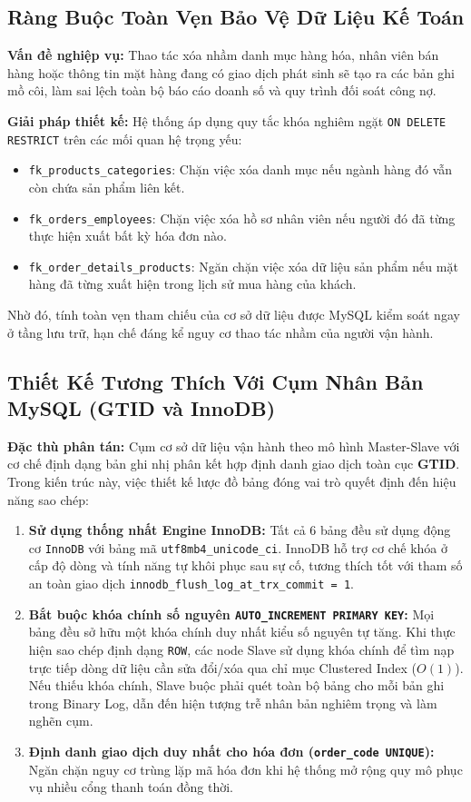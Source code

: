 \documentclass[12pt,a4paper]{report}
\begin{document}
\subsection{Ràng Buộc Toàn Vẹn Bảo Vệ Dữ Liệu Kế Toán}
\noindent\textbf{Vấn đề nghiệp vụ:} Thao tác xóa nhầm danh mục hàng hóa, nhân viên bán hàng hoặc thông tin mặt hàng đang có giao dịch phát sinh sẽ tạo ra các bản ghi mồ côi, làm sai lệch toàn bộ báo cáo doanh số và quy trình đối soát công nợ.

\vspace{0.2cm}
\noindent\textbf{Giải pháp thiết kế:} Hệ thống áp dụng quy tắc khóa nghiêm ngặt \texttt{ON DELETE RESTRICT} trên các mối quan hệ trọng yếu:
\begin{itemize}
    \item \texttt{fk\_products\_categories}: Chặn việc xóa danh mục nếu ngành hàng đó vẫn còn chứa sản phẩm liên kết.
    \item \texttt{fk\_orders\_employees}: Chặn việc xóa hồ sơ nhân viên nếu người đó đã từng thực hiện xuất bất kỳ hóa đơn nào.
    \item \texttt{fk\_order\_details\_products}: Ngăn chặn việc xóa dữ liệu sản phẩm nếu mặt hàng đã từng xuất hiện trong lịch sử mua hàng của khách.
\end{itemize}
Nhờ đó, tính toàn vẹn tham chiếu của cơ sở dữ liệu được MySQL kiểm soát ngay ở tầng lưu trữ, hạn chế đáng kể nguy cơ thao tác nhầm của người vận hành.

\subsection{Thiết Kế Tương Thích Với Cụm Nhân Bản MySQL (GTID và InnoDB)}
\noindent\textbf{Đặc thù phân tán:} Cụm cơ sở dữ liệu vận hành theo mô hình Master-Slave với cơ chế định dạng bản ghi nhị phân kết hợp định danh giao dịch toàn cục \textbf{GTID}. Trong kiến trúc này, việc thiết kế lược đồ bảng đóng vai trò quyết định đến hiệu năng sao chép:
\begin{enumerate}
    \item \textbf{Sử dụng thống nhất Engine InnoDB:} Tất cả 6 bảng đều sử dụng động cơ \texttt{InnoDB} với bảng mã \texttt{utf8mb4\_unicode\_ci}. InnoDB hỗ trợ cơ chế khóa ở cấp độ dòng và tính năng tự khôi phục sau sự cố, tương thích tốt với tham số an toàn giao dịch \texttt{innodb\_flush\_log\_at\_trx\_commit = 1}.
    \item \textbf{Bắt buộc khóa chính số nguyên \texttt{AUTO\_INCREMENT PRIMARY KEY}:} Mọi bảng đều sở hữu một khóa chính duy nhất kiểu số nguyên tự tăng. Khi thực hiện sao chép định dạng \texttt{ROW}, các node Slave sử dụng khóa chính để tìm nạp trực tiếp dòng dữ liệu cần sửa đổi/xóa qua chỉ mục Clustered Index ($O(1)$). Nếu thiếu khóa chính, Slave buộc phải quét toàn bộ bảng cho mỗi bản ghi trong Binary Log, dẫn đến hiện tượng trễ nhân bản nghiêm trọng và làm nghẽn cụm.
    \item \textbf{Định danh giao dịch duy nhất cho hóa đơn (\texttt{order\_code UNIQUE}):} Ngăn chặn nguy cơ trùng lặp mã hóa đơn khi hệ thống mở rộng quy mô phục vụ nhiều cổng thanh toán đồng thời.
\end{enumerate}
\end{document}
